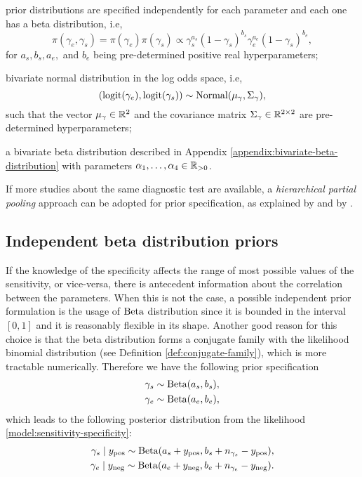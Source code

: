 \begin{alineas}
  \item prior distributions are specified independently for each parameter and
  each one has a beta distribution, i.e,  
  $$\pi(\gamma_e, \gamma_s) =
  \pi(\gamma_e)\pi(\gamma_s) \propto \gamma_s^{a_s}(1-
  \gamma_s)^{b_s}\gamma_e^{a_e}(1-\gamma_s)^{b_e},$$
  for $a_s, b_s, a_e,$ and $b_e$ being pre-determined positive real hyperparameters;
  \item bivariate normal distribution in the log odds space, i.e,  
  $$(\operatorname{logit}(\gamma_e), \operatorname{logit}(\gamma_s)) \sim
  \operatorname{Normal}(\mu_{\gamma}, \Sigma_{\gamma}),$$
  such that the vector $\mu_{\gamma} \in \mathbb{R}^2$ and the covariance matrix
  $\Sigma_{\gamma} \in \mathbb{R}^{2\times 2}$ are pre-determined hyperparameters;
  \item a bivariate beta distribution described in Appendix \ref{appendix:bivariate-beta-distribution}
  with parameters $\alpha_1, \dots, \alpha_4 \in \mathbb{R}_{>0}$.
\end{alineas}

If more studies about the same diagnostic test are available, a {\em
hierarchical partial pooling} approach can be adopted for prior specification,
as explained by \textcite[p. 1272-1274]{gelman2020bayesian} and by
\textcite[p. 2-3]{guo2017bayesian}.  

\subsection{Independent beta distribution priors}

If the knowledge of the specificity affects the range of most possible values
of the sensitivity, or vice-versa, there is antecedent information about the
correlation between the parameters. When this is not the case, a possible
independent prior formulation is the usage of $\operatorname{Beta}$ distribution since
it is bounded in the interval $[0,1]$ and it is reasonably flexible in its
shape.  Another good reason for this choice is that the beta distribution
forms a conjugate family with the likelihood binomial distribution (see Definition
\ref{def:conjugate-family}), which is more tractable numerically. Therefore we
have the following prior specification 
\begin{equation*}
  \begin{aligned}
    \gamma_s &\sim \operatorname{Beta}(a_s, b_s), \\
    \gamma_e &\sim \operatorname{Beta}(a_e, b_e), 
  \end{aligned}
\end{equation*}
which leads to the following posterior distribution from the likelihood
\eqref{model:sensitivity-specificity}:
\begin{equation*}
  \begin{aligned}
    \gamma_s \mid y_{\mathrm{pos}} \sim \operatorname{Beta}(a_s + y_{\mathrm{pos}}, b_s + n_{\gamma_s} - y_{\mathrm{pos}}), \\
    \gamma_e \mid y_{\mathrm{neg}} \sim \operatorname{Beta}(a_e + y_{\mathrm{neg}}, b_e + n_{\gamma_e} - y_{\mathrm{neg}}).
  \end{aligned}
\end{equation*}


